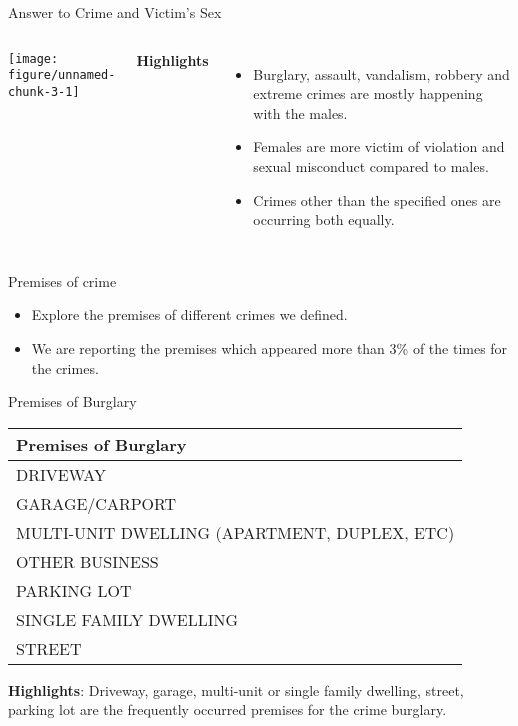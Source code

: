 \documentclass{beamer}\usepackage[]{graphicx}\usepackage[]{xcolor}
\makeatletter
\def\maxwidth{ %
  \ifdim\Gin@nat@width>\linewidth
    \linewidth
  \else
    \Gin@nat@width
  \fi
}
\newenvironment{knitrout}{}{} %
\makeatother
\begin{document}
\begin{frame}[fragile]{Answer to Crime and Victim's Sex}
\begin{columns}
\begin{knitrout}
\color{fgcolor}
\texttt{[image: figure/unnamed-chunk-3-1]} 
\end{knitrout}

\textbf{Highlights}
\begin{itemize}
\item Burglary, assault, vandalism, robbery and extreme crimes are mostly happening with the males.
\item Females are more victim of violation and sexual misconduct compared to males. 
\item Crimes other than the specified ones are occurring both equally.

\end{itemize}

\end{columns}
\end{frame} 


\begin{frame}[fragile]{Premises of crime}

\begin{itemize}
\item Explore the premises of different crimes we defined.
\item We are reporting the premises which appeared more than 3\% of the times for the crimes.

\end{itemize}

\end{frame}

\begin{frame}[fragile]{Premises of Burglary}
\begin{knitrout}
\color{fgcolor}
\begin{tabular}{l}
\hline
Premises of Burglary\\
\hline
DRIVEWAY\\
\hline
GARAGE/CARPORT\\
\hline
MULTI-UNIT DWELLING (APARTMENT, DUPLEX, ETC)\\
\hline
OTHER BUSINESS\\
\hline
PARKING LOT\\
\hline
SINGLE FAMILY DWELLING\\
\hline
STREET\\
\hline
\end{tabular}

\end{knitrout}
\vspace{0.5cm}
\textbf{Highlights}: Driveway, garage, multi-unit or single family dwelling, street, parking lot are the frequently occurred premises for the crime burglary.

\end{frame}
\end{document}
